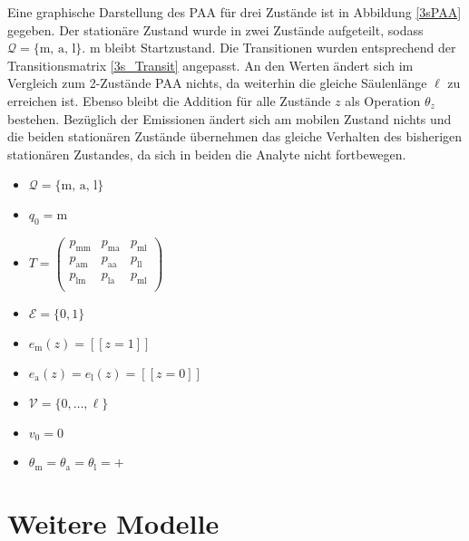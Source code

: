 Eine graphische Darstellung des PAA für drei Zustände ist in Abbildung \ref{3sPAA} gegeben. Der stationäre Zustand wurde in zwei Zustände aufgeteilt, sodass $\mathcal{Q} = \{\text{m, a, l}\}$. m bleibt Startzustand. Die Transitionen wurden entsprechend der Transitionsmatrix \ref{3s_Transit} angepasst. An den Werten ändert sich im Vergleich zum 2-Zustände PAA nichts, da weiterhin die gleiche Säulenlänge $\ell$ zu erreichen ist. Ebenso bleibt die Addition für alle Zustände $z$ als Operation $\theta_z$ bestehen. Bezüglich der Emissionen ändert sich am mobilen Zustand nichts und die beiden stationären Zustände übernehmen das gleiche Verhalten des bisherigen stationären Zustandes, da sich in beiden die Analyte nicht fortbewegen.

\begin{itemize}
 \item $ \mathcal{Q} = \{\text{m, a, l}\}  $
 \item $  q_0 = \text{m} $
 \item $ T = \begin{pmatrix}
  p_{\text{mm}} & p_{\text{ma}} & p_{\text{ml}} \\
  p_{\text{am}} & p_{\text{aa}} & p_{\text{ll}} \\
  p_{\text{lm}} & p_{\text{la}} & p_{\text{ml}} \\
 \end{pmatrix} $
 \item $  \mathcal{E} = \{0, 1\} $
 \item $ e_{\text{m}}(z) = [\![ z=1 ]\!]$
 \item $  e_{\text{a}}(z) = e_{\text{l}}(z) = [\![ z=0 ]\!]$
 \item $  %
 \mathcal{V} = \{0, \ldots, \ell\} $
 \item $ v_0 = 0 $
 \item $  \theta_{\text{m}} = \theta_{\text{a}} = \theta_{\text{l}} = + $
\end{itemize}

\section{Weitere Modelle}

